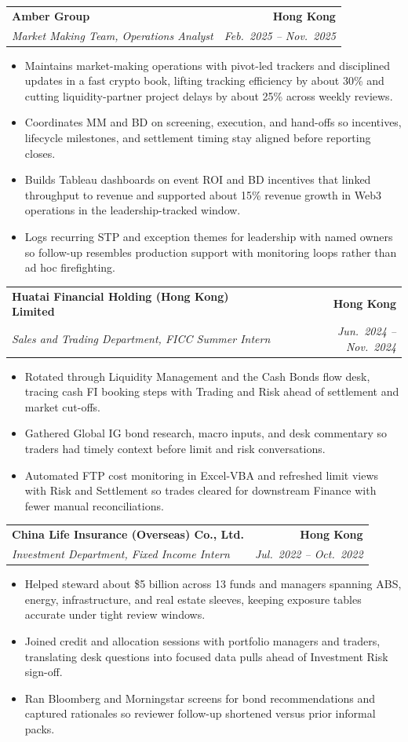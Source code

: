 \documentclass[9pt,a4paper]{extarticle}
\makeatletter
\newcommand{\resumeSubheading}[4]{%
  \vspace{0.6em}%
  \begin{tabular*}{\textwidth}{l@{\extracolsep{\fill}}r}
    \textbf{#1} & \textbf{#2} \\
    \textit{\small #3} & \textit{\small #4} \\
  \end{tabular*}\vspace{0.32em}}
\makeatother
\begin{document}
\resumeSubheading{Amber Group}{Hong Kong}{Market Making Team, Operations Analyst}{Feb.\ 2025 -- Nov.\ 2025}
\begin{itemize}
  \item Maintains market-making operations with pivot-led trackers and disciplined updates in a fast crypto book, lifting tracking efficiency by about 30\% and cutting liquidity-partner project delays by about 25\% across weekly reviews.
  \item Coordinates MM and BD on screening, execution, and hand-offs so incentives, lifecycle milestones, and settlement timing stay aligned before reporting closes.
  \item Builds Tableau dashboards on event ROI and BD incentives that linked throughput to revenue and supported about 15\% revenue growth in Web3 operations in the leadership-tracked window.
  \item Logs recurring STP and exception themes for leadership with named owners so follow-up resembles production support with monitoring loops rather than ad hoc firefighting.
\end{itemize}

\resumeSubheading{Huatai Financial Holding (Hong Kong) Limited}{Hong Kong}{Sales and Trading Department, FICC Summer Intern}{Jun.\ 2024 -- Nov.\ 2024}
\begin{itemize}
  \item Rotated through Liquidity Management and the Cash Bonds flow desk, tracing cash FI booking steps with Trading and Risk ahead of settlement and market cut-offs.
  \item Gathered Global IG bond research, macro inputs, and desk commentary so traders had timely context before limit and risk conversations.
  \item Automated FTP cost monitoring in Excel-VBA and refreshed limit views with Risk and Settlement so trades cleared for downstream Finance with fewer manual reconciliations.
\end{itemize}

\resumeSubheading{China Life Insurance (Overseas) Co., Ltd.}{Hong Kong}{Investment Department, Fixed Income Intern}{Jul.\ 2022 -- Oct.\ 2022}
\begin{itemize}
  \item Helped steward about \$5 billion across 13 funds and managers spanning ABS, energy, infrastructure, and real estate sleeves, keeping exposure tables accurate under tight review windows.
  \item Joined credit and allocation sessions with portfolio managers and traders, translating desk questions into focused data pulls ahead of Investment Risk sign-off.
  \item Ran Bloomberg and Morningstar screens for bond recommendations and captured rationales so reviewer follow-up shortened versus prior informal packs.
\end{itemize}
\end{document}
